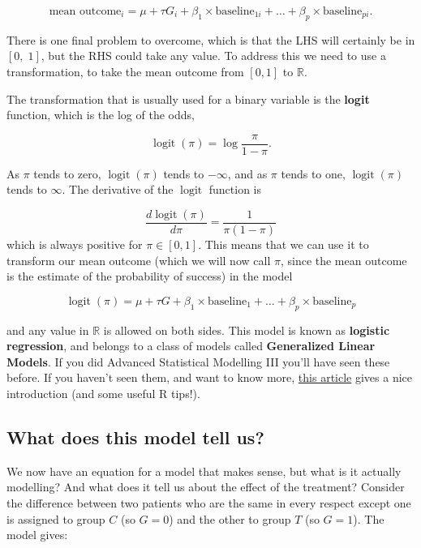 \documentclass[
  openany]{book}
\theoremstyle{definition}
\theoremstyle{definition}
\theoremstyle{definition}
\theoremstyle{definition}
\theoremstyle{remark}
\begin{document}
\[\text{mean outcome}_i = \mu + \tau G_i + \beta_1\times{\text{baseline}_{1i}} + \ldots + \beta_p\times{\text{baseline}_{pi}}.\]

There is one final problem to overcome, which is that the LHS will certainly be in \(\left[0,\;1\right]\), but the RHS could take any value. To address this we need to use a transformation, to take the mean outcome from \(\left[0,1\right]\) to \(\mathbb{R}\).

The transformation that is usually used for a binary variable is the \textbf{logit} function, which is the log of the odds,

\[\operatorname{logit}\left(\pi\right) = \log\frac{\pi}{1-\pi}.\]

As \(\pi\) tends to zero, \(\operatorname{logit}\left(\pi\right)\) tends to \(-\infty\), and as \(\pi\) tends to one, \(\operatorname{logit}\left(\pi\right)\) tends to \(\infty\). The derivative of the \(\operatorname{logit}\) function is

\[ \frac{d\operatorname{logit}\left(\pi\right)}{d\pi} = \frac{1}{\pi\left(1-\pi\right)}\]
which is always positive for \(\pi\in\left[0,1\right]\). This means that we can use it to transform our mean outcome (which we will now call \(\pi\), since the mean outcome is the estimate of the probability of success) in the model

\begin{equation}
\operatorname{logit}\left(\pi\right) = \mu + \tau G + \beta_1\times{\text{baseline}_{1}} + \ldots + \beta_p\times{\text{baseline}_{p}}
\label{eq:logreg1}
\end{equation}

and any value in \(\mathbb{R}\) is allowed on both sides. This model is known as \textbf{logistic regression}, and belongs to a class of models called \textbf{Generalized Linear Models}. If you did Advanced Statistical Modelling III you'll have seen these before. If you haven't seen them, and want to know more, \href{https://www.r-bloggers.com/2015/08/generalised-linear-models-in-r/}{this article} gives a nice introduction (and some useful R tips!).

\subsection{What does this model tell us?}\label{what-does-this-model-tell-us}

We now have an equation for a model that makes sense, but what is it actually modelling? And what does it tell us about the effect of the treatment?
Consider the difference between two patients who are the same in every respect except one is assigned to group \(C\) (so \(G=0\)) and the other to group \(T\) (so \(G=1\)). The model gives:
\end{document}
